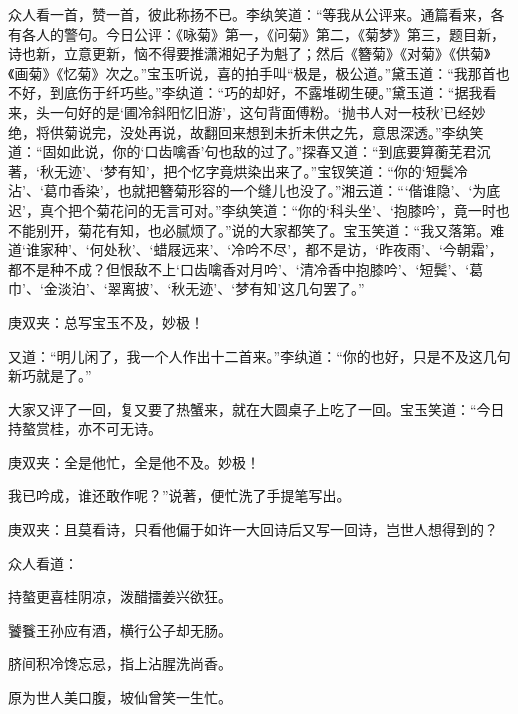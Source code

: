 \begin{parag}
    众人看一首，赞一首，彼此称扬不已。李纨笑道：“等我从公评来。通篇看来，各有各人的警句。今日公评：《咏菊》第一，《问菊》第二，《菊梦》第三，题目新，诗也新，立意更新，恼不得要推潇湘妃子为魁了；然后《簪菊》《对菊》《供菊》《画菊》《忆菊》次之。”宝玉听说，喜的拍手叫“极是，极公道。”黛玉道：“我那首也不好，到底伤于纤巧些。”李纨道：“巧的却好，不露堆砌生硬。”黛玉道：“据我看来，头一句好的是‘圃冷斜阳忆旧游’，这句背面傅粉。‘抛书人对一枝秋’已经妙绝，将供菊说完，没处再说，故翻回来想到未折未供之先，意思深透。”李纨笑道：“固如此说，你的‘口齿噙香’句也敌的过了。”探春又道：“到底要算蘅芜君沉著，‘秋无迹’、‘梦有知’，把个忆字竟烘染出来了。”宝钗笑道：“你的‘短鬓冷沾’、‘葛巾香染’，也就把簪菊形容的一个缝儿也没了。”湘云道：“‘偕谁隐’、‘为底迟’，真个把个菊花问的无言可对。”李纨笑道：“你的‘科头坐’、‘抱膝吟’，竟一时也不能别开，菊花有知，也必腻烦了。”说的大家都笑了。宝玉笑道：“我又落第。难道‘谁家种’、‘何处秋’、‘蜡屐远来’、‘冷吟不尽’，都不是访，‘昨夜雨’、‘今朝霜’，都不是种不成？但恨敌不上‘口齿噙香对月吟’、‘清冷香中抱膝吟’、‘短鬓’、‘葛巾’、‘金淡泊’、‘翠离披’、‘秋无迹’、‘梦有知’这几句罢了。”\begin{note}庚双夹：总写宝玉不及，妙极！\end{note}又道：“明儿闲了，我一个人作出十二首来。”李纨道：“你的也好，只是不及这几句新巧就是了。”
\end{parag}


\begin{parag}
    大家又评了一回，复又要了热蟹来，就在大圆桌子上吃了一回。宝玉笑道：“今日持螯赏桂，亦不可无诗。\begin{note}庚双夹：全是他忙，全是他不及。妙极！\end{note}我已吟成，谁还敢作呢？”说著，便忙洗了手提笔写出。\begin{note}庚双夹：且莫看诗，只看他偏于如许一大回诗后又写一回诗，岂世人想得到的？\end{note}众人看道：
\end{parag}


\begin{poem}
    \begin{pl}持螯更喜桂阴凉，泼醋擂姜兴欲狂。\end{pl}

    \begin{pl}饕餮王孙应有酒，横行公子却无肠。\end{pl}

    \begin{pl}脐间积冷馋忘忌，指上沾腥洗尚香。\end{pl}

    \begin{pl}原为世人美口腹，坡仙曾笑一生忙。\end{pl}


\end{poem}



